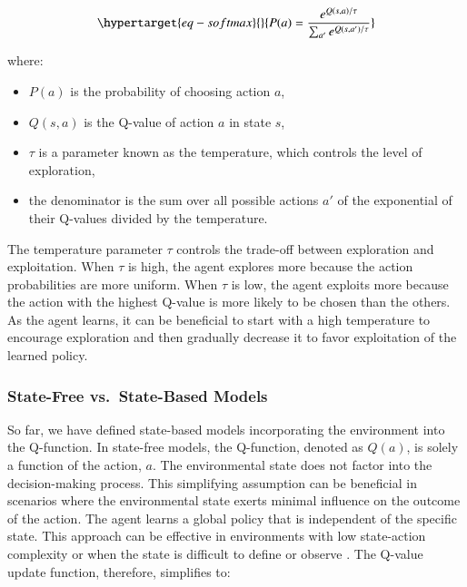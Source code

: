 \documentclass[
  number,
  preprint,
  3p,
  onecolumn]{elsarticle}
\begin{document}
\begin{equation}\protect\hypertarget{eq-softmax}{}{
P(a) = \frac{e^{Q(s, a)/\tau}}{\sum_{a'} e^{Q(s, a')/\tau}}
}\label{eq-softmax}\end{equation}

where:

\begin{itemize}
\item
  \(P(a)\) is the probability of choosing action \(a\),
\item
  \(Q(s, a)\) is the Q-value of action \(a\) in state \(s\),
\item
  \(\tau\) is a parameter known as the temperature, which controls the
  level of exploration,
\item
  the denominator is the sum over all possible actions \(a'\) of the
  exponential of their Q-values divided by the temperature.
\end{itemize}

The temperature parameter \(\tau\) controls the trade-off between
exploration and exploitation. When \(\tau\) is high, the agent explores
more because the action probabilities are more uniform. When \(\tau\) is
low, the agent exploits more because the action with the highest Q-value
is more likely to be chosen than the others. As the agent learns, it can
be beneficial to start with a high temperature to encourage exploration
and then gradually decrease it to favor exploitation of the learned
policy.

\hypertarget{state-free-vs.-state-based-models}{%
\subsubsection{State-Free vs.~State-Based
Models}\label{state-free-vs.-state-based-models}}

So far, we have defined state-based models incorporating the environment
into the Q-function. In state-free models, the Q-function, denoted as
\(Q(a)\), is solely a function of the action, \(a\). The environmental
state does not factor into the decision-making process. This simplifying
assumption can be beneficial in scenarios where the environmental state
exerts minimal influence on the outcome of the action. The agent learns
a global policy that is independent of the specific state. This approach
can be effective in environments with low state-action complexity or
when the state is difficult to define or observe \citep{sutton2018}. The
Q-value update function, therefore, simplifies to:
\end{document}
